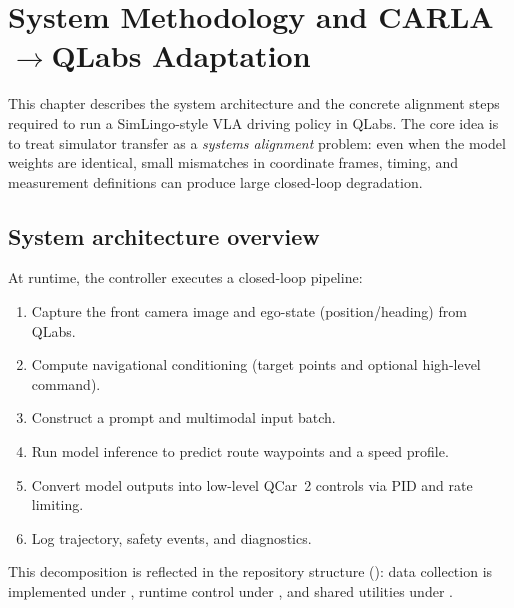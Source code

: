 \chapter{System Methodology and CARLA\texorpdfstring{$\rightarrow$}{->}QLabs Adaptation}
\label{ch:methodology}

This chapter describes the system architecture and the concrete alignment steps required to run a SimLingo-style VLA driving policy in QLabs. The core idea is to treat simulator transfer as a \emph{systems alignment} problem: even when the model weights are identical, small mismatches in coordinate frames, timing, and measurement definitions can produce large closed-loop degradation.

\section{System architecture overview}
\label{sec:method-arch}
At runtime, the controller executes a closed-loop pipeline:
\begin{enumerate}[leftmargin=*]
  \item Capture the front camera image and ego-state (position/heading) from QLabs.
  \item Compute navigational conditioning (target points and optional high-level command).
  \item Construct a prompt and multimodal input batch.
  \item Run model inference to predict route waypoints and a speed profile.
  \item Convert model outputs into low-level QCar~2 controls via PID and rate limiting.
  \item Log trajectory, safety events, and diagnostics.
\end{enumerate}

This decomposition is reflected in the repository structure (): data collection is implemented under , runtime control under , and shared utilities under .


